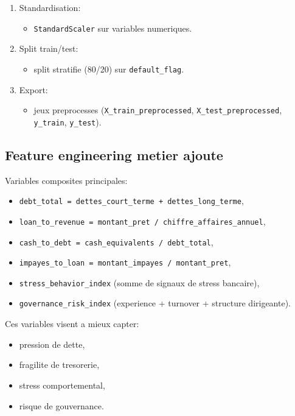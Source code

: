 \documentclass[11pt,a4paper]{article}
\begin{document}
\begin{enumerate}[leftmargin=1.2cm, label=\arabic*., widest=9]
  \item Standardisation:
  \begin{itemize}
    \item \texttt{StandardScaler} sur variables numeriques.
  \end{itemize}

  \item Split train/test:
  \begin{itemize}
    \item split stratifie (80/20) sur \texttt{default\_flag}.
  \end{itemize}

  \item Export:
  \begin{itemize}
    \item jeux preprocesses (\texttt{X\_train\_preprocessed}, \texttt{X\_test\_preprocessed}, \texttt{y\_train}, \texttt{y\_test}).
  \end{itemize}
\end{enumerate}

\subsection{Feature engineering metier ajoute}

Variables composites principales:
\begin{itemize}[leftmargin=1.2cm]
  \item \texttt{debt\_total = dettes\_court\_terme + dettes\_long\_terme},
  \item \texttt{loan\_to\_revenue = montant\_pret / chiffre\_affaires\_annuel},
  \item \texttt{cash\_to\_debt = cash\_equivalents / debt\_total},
  \item \texttt{impayes\_to\_loan = montant\_impayes / montant\_pret},
  \item \texttt{stress\_behavior\_index} (somme de signaux de stress bancaire),
  \item \texttt{governance\_risk\_index} (experience + turnover + structure dirigeante).
\end{itemize}

Ces variables visent a mieux capter:
\begin{itemize}[leftmargin=1.2cm]
  \item pression de dette,
  \item fragilite de tresorerie,
  \item stress comportemental,
  \item risque de gouvernance.
\end{itemize}
\end{document}

